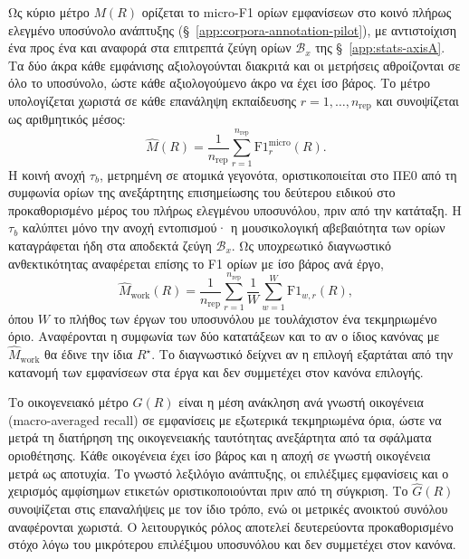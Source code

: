 \documentclass[11pt,a4paper]{article}
\begin{document}
Ως κύριο μέτρο \(M(R)\) ορίζεται το micro-F1 ορίων εμφανίσεων στο κοινό πλήρως ελεγμένο υποσύνολο ανάπτυξης (§~\ref{app:corpora-annotation-pilot}), με αντιστοίχιση ένα προς ένα και αναφορά στα επιτρεπτά ζεύγη ορίων \(\mathcal B_x\) της §~\ref{app:stats-axisA}. Τα δύο άκρα κάθε εμφάνισης αξιολογούνται διακριτά και οι μετρήσεις αθροίζονται σε όλο το υποσύνολο, ώστε κάθε αξιολογούμενο άκρο να έχει ίσο βάρος. Το μέτρο υπολογίζεται χωριστά σε κάθε επανάληψη εκπαίδευσης \(r=1,\dots,n_{\mathrm{rep}}\) και συνοψίζεται ως αριθμητικός μέσος:
\[
\widehat M(R)=\frac{1}{n_{\mathrm{rep}}}\sum_{r=1}^{n_{\mathrm{rep}}}\mathrm{F1}^{\mathrm{micro}}_{r}(R).
\]
Η κοινή ανοχή \(\tau_b\), μετρημένη σε ατομικά γεγονότα, οριστικοποιείται στο ΠΕ0 από τη συμφωνία ορίων της ανεξάρτητης επισημείωσης του δεύτερου ειδικού στο προκαθορισμένο μέρος του πλήρως ελεγμένου υποσυνόλου, πριν από την κατάταξη. Η \(\tau_b\) καλύπτει μόνο την ανοχή εντοπισμού· η μουσικολογική αβεβαιότητα των ορίων καταγράφεται ήδη στα αποδεκτά ζεύγη \(\mathcal B_x\). Ως υποχρεωτικό διαγνωστικό ανθεκτικότητας αναφέρεται επίσης το F1 ορίων με ίσο βάρος ανά έργο,
\[
\widehat M_{\mathrm{work}}(R)=\frac{1}{n_{\mathrm{rep}}}\sum_{r=1}^{n_{\mathrm{rep}}}\frac1W\sum_{w=1}^{W}\mathrm{F1}_{w,r}(R),
\]
όπου \(W\) το πλήθος των έργων του υποσυνόλου με τουλάχιστον ένα τεκμηριωμένο όριο. Αναφέρονται η συμφωνία των δύο κατατάξεων και το αν ο ίδιος κανόνας με \(\widehat M_{\mathrm{work}}\) θα έδινε την ίδια \(R^\star\). Το διαγνωστικό δείχνει αν η επιλογή εξαρτάται από την κατανομή των εμφανίσεων στα έργα και δεν συμμετέχει στον κανόνα επιλογής.

Το οικογενειακό μέτρο \(G(R)\) είναι η μέση ανάκληση ανά γνωστή οικογένεια (macro-averaged recall) σε εμφανίσεις με εξωτερικά τεκμηριωμένα όρια, ώστε να μετρά τη διατήρηση της οικογενειακής ταυτότητας ανεξάρτητα από τα σφάλματα οριοθέτησης. Κάθε οικογένεια έχει ίσο βάρος και η αποχή σε γνωστή οικογένεια μετρά ως αποτυχία. Το γνωστό λεξιλόγιο ανάπτυξης, οι επιλέξιμες εμφανίσεις και ο χειρισμός αμφίσημων ετικετών οριστικοποιούνται πριν από τη σύγκριση. Το \(\widehat G(R)\) συνοψίζεται στις επαναλήψεις με τον ίδιο τρόπο, ενώ οι μετρικές ανοικτού συνόλου αναφέρονται χωριστά. Ο λειτουργικός ρόλος αποτελεί δευτερεύοντα προκαθορισμένο στόχο λόγω του μικρότερου επιλέξιμου υποσυνόλου και δεν συμμετέχει στον κανόνα.
\end{document}
